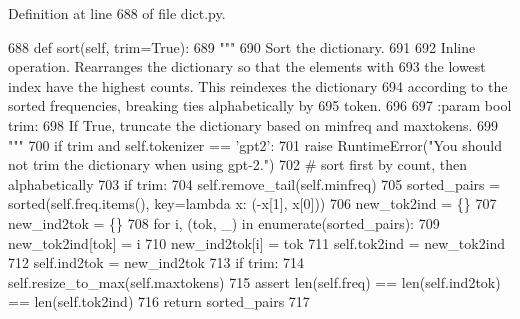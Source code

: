 Definition at line 688 of file dict.\+py.


\begin{DoxyCode}
688     \textcolor{keyword}{def }sort(self, trim=True):
689         \textcolor{stringliteral}{"""}
690 \textcolor{stringliteral}{        Sort the dictionary.}
691 \textcolor{stringliteral}{}
692 \textcolor{stringliteral}{        Inline operation. Rearranges the dictionary so that the elements with}
693 \textcolor{stringliteral}{        the lowest index have the highest counts. This reindexes the dictionary}
694 \textcolor{stringliteral}{        according to the sorted frequencies, breaking ties alphabetically by}
695 \textcolor{stringliteral}{        token.}
696 \textcolor{stringliteral}{}
697 \textcolor{stringliteral}{        :param bool trim:}
698 \textcolor{stringliteral}{            If True, truncate the dictionary based on minfreq and maxtokens.}
699 \textcolor{stringliteral}{        """}
700         \textcolor{keywordflow}{if} trim \textcolor{keywordflow}{and} self.tokenizer == \textcolor{stringliteral}{'gpt2'}:
701             \textcolor{keywordflow}{raise} RuntimeError(\textcolor{stringliteral}{"You should not trim the dictionary when using gpt-2."})
702         \textcolor{comment}{# sort first by count, then alphabetically}
703         \textcolor{keywordflow}{if} trim:
704             self.remove\_tail(self.minfreq)
705         sorted\_pairs = sorted(self.freq.items(), key=\textcolor{keyword}{lambda} x: (-x[1], x[0]))
706         new\_tok2ind = \{\}
707         new\_ind2tok = \{\}
708         \textcolor{keywordflow}{for} i, (tok, \_) \textcolor{keywordflow}{in} enumerate(sorted\_pairs):
709             new\_tok2ind[tok] = i
710             new\_ind2tok[i] = tok
711         self.tok2ind = new\_tok2ind
712         self.ind2tok = new\_ind2tok
713         \textcolor{keywordflow}{if} trim:
714             self.resize\_to\_max(self.maxtokens)
715         \textcolor{keyword}{assert} len(self.freq) == len(self.ind2tok) == len(self.tok2ind)
716         \textcolor{keywordflow}{return} sorted\_pairs
717 
\end{DoxyCode}
\mbox{\label{classparlai_1_1core_1_1dict_1_1DictionaryAgent_a437d3aacc7b55dac587643b271ba5f38}} 
